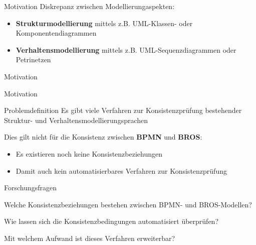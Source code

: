 \begin{frame}{Motivation}
  Diskrepanz zwischen Modellierungaspekten:

  \begin{itemize}
    \item \textbf{Strukturmodellierung} mittels z.B. UML-Klassen- oder Komponentendiagrammen 

    \item \textbf{Verhaltensmodellierung} mittels z.B. UML-Sequenzdiagrammen oder Petrinetzen
  \end{itemize}
\end{frame}
\begin{frame}{Motivation}
  
\end{frame}
\begin{frame}{Motivation}
  
\end{frame}

\begin{frame}{Problemdefinition}
  Es gibt viele Verfahren zur Konsistenzprüfung bestehender Struktur- und Verhaltensmodellierungsprachen

  Dies gilt nicht für die Konsistenz zwischen \textbf{BPMN} und \textbf{BROS}:

  \begin{itemize}
    \item Es existieren noch keine Konsistenzbeziehungen

    \item Damit auch kein automatisierbares Verfahren zur Konsistenzprüfung
  \end{itemize}
\end{frame}

\begin{frame}{Forschungsfragen}
  \begin{description}[4cm]
    \item[F1] Welche Konsistenzbeziehungen bestehen zwischen BPMN- und BROS-Modellen?

    \item[F2] Wie lassen sich die Konsistenzbedingungen automatisiert überprüfen?

    \item[F3] Mit welchem Aufwand ist dieses Verfahren erweiterbar?
  \end{description}
\end{frame}
